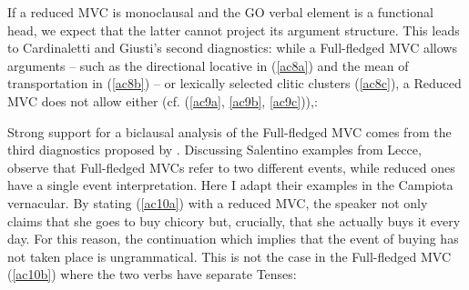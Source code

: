 \documentclass[output=paper]{langscibook}
\begin{document}
If a reduced MVC is monoclausal and the GO verbal element is a functional head, we expect that the latter cannot project its argument structure. This leads to Cardinaletti and Giusti’s second diagnostics: while a Full-fledged MVC allows arguments -- such as the directional  locative in (\ref{ac8a}) and the mean of transportation in (\ref{ac8b}) -- or lexically selected clitic clusters (\ref{ac8c}), a Reduced MVC does not allow either (cf. (\ref{ac9a}, \ref{ac9b}, \ref{ac9c})),:

\ea \label{ac8}
    \z
\ex \label{ac9}
    \z
\z

Strong support for a biclausal analysis of the Full-fledged MVC comes from the third diagnostics proposed by \citet{cardinaletti2001a, cardinaletti2019a}. Discussing Salentino examples from Lecce, \cite{cardinaletti2019a} observe that Full-fledged MVCs refer to two different events, while reduced ones have a single event interpretation. Here I adapt their examples in the Campiota vernacular.  By stating (\ref{ac10a}) with a reduced MVC, the speaker not only claims that she goes to buy chicory but, crucially, that she actually buys it every day. For this reason, the continuation which implies that the event of buying has not taken place is ungrammatical. This is not the case in the Full-fledged MVC (\ref{ac10b}) where the two verbs have separate Tenses:
\end{document}
